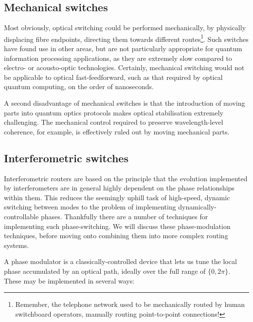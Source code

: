%
%

\subsection{Mechanical switches}

Most obviously, optical switching could be performed mechanically, by physically displacing fibre endpoints, directing them towards different routes\footnote{Remember, the telephone network used to be mechanically routed by human switchboard operators, manually routing point-to-point connections!}. Such switches have found use in other areas, but are not particularly appropriate for quantum information processing applications, as they are extremely slow compared to electro- or acousto-optic technologies. Certainly, mechanical switching would not be applicable to optical fast-feedforward, such as that required by optical quantum computing, on the order of nanoseconds.

A second disadvantage of mechanical switches is that the introduction of moving parts into quantum optics protocols makes optical stabilisation extremely challenging. The mechanical control required to preserve wavelength-level coherence, for example, is effectively ruled out by moving mechanical parts.

%
%

\subsection{Interferometric switches} \label{sec:interfer_switches}


Interferometric routers are based on the principle that the evolution implemented by interferometers are in general highly dependent on the phase relationships within them. This reduces the seemingly uphill task of high-speed, dynamic switching between modes to the problem of implementing dynamically-controllable phases. Thankfully there are a number of techniques for implementing such phase-switching. We will discuss these phase-modulation techniques, before moving onto combining them into more complex routing systems.

A phase modulator is a classically-controlled device that lets us tune the local phase accumulated by an optical path, ideally over the full range of $\{0,2\pi\}$. These may be implemented in several ways:

